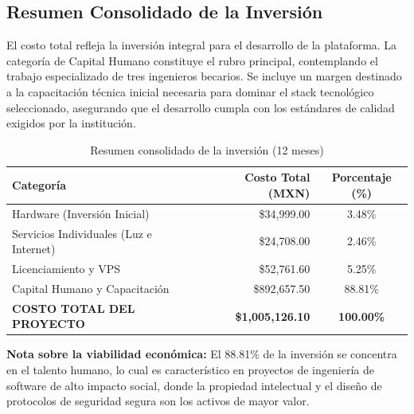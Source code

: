 \subsection{Resumen Consolidado de la Inversión}

El costo total refleja la inversión integral para el desarrollo de la plataforma. La categoría de Capital Humano constituye el rubro principal, contemplando el trabajo especializado de tres ingenieros becarios. Se incluye un margen destinado a la capacitación técnica inicial necesaria para dominar el stack tecnológico seleccionado, asegurando que el desarrollo cumpla con los estándares de calidad exigidos por la institución.

\begin{table}[h!]
\centering
\caption{Resumen consolidado de la inversión (12 meses)}
\begin{tabular}{|l|r|c|}
\hline
\textbf{Categoría} & \textbf{Costo Total (MXN)} & \textbf{Porcentaje (\%)} \\ \hline
Hardware (Inversión Inicial) & \$34,999.00 & 3.48\% \\ \hline
Servicios Individuales (Luz e Internet) & \$24,708.00 & 2.46\% \\ \hline
Licenciamiento y VPS & \$52,761.60 & 5.25\% \\ \hline
Capital Humano y Capacitación & \$892,657.50 & 88.81\% \\ \hline
\textbf{COSTO TOTAL DEL PROYECTO} & \textbf{\$1,005,126.10} & \textbf{100.00\%} \\ \hline
\end{tabular}
\end{table}

\vspace{5mm}
\noindent \textbf{Nota sobre la viabilidad económica:} El 88.81\% de la inversión se concentra en el talento humano, lo cual es característico en proyectos de ingeniería de software de alto impacto social, donde la propiedad intelectual y el diseño de protocolos de seguridad segura son los activos de mayor valor.